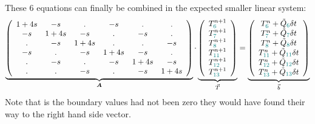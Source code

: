 These 6 equations can finally be combined in the expected smaller linear system:
\begin{equation}
\underbrace{
\left(
\begin{array}{cccccc}
1+4s & -s & . & -s & . & . \\
-s & 1+4s & -s & . & -s & . \\
. & -s & 1+4s & . & . & -s \\ 
-s & . & -s & 1+4s & -s & . \\
. & -s & . & -s & 1+4s & -s \\
. & . & -s & . & -s & 1+4s 
\end{array}
\right)
}_{\bm A}
\cdot
\underbrace{
\left(
\begin{array}{c}
T_{{\color{teal}6}}^{n+1} \\ 
T_{{\color{teal}7}}^{n+1} \\ 
T_{{\color{teal}8}}^{n+1} \\ 
T_{{\color{teal}11}}^{n+1} \\ 
T_{{\color{teal}12}}^{n+1} \\ 
T_{{\color{teal}13}}^{n+1} 
\end{array}
\right)
}_{\vec T}
=
\underbrace{
\left(
\begin{array}{c}
T_{{\color{teal}6}}^n + \tilde{Q}_{\color{teal}6}\delta t \\ 
T_{{\color{teal}7}}^n + \tilde{Q}_{\color{teal}7} \delta t\\ 
T_{{\color{teal}8}}^n + \tilde{Q}_{\color{teal}8} \delta t\\ 
T_{{\color{teal}11}}^n + \tilde{Q}_{\color{teal}11} \delta t\\ 
T_{{\color{teal}12}}^n + \tilde{Q}_{\color{teal}12} \delta t\\ 
T_{{\color{teal}13}}^n + \tilde{Q}_{\color{teal}13} \delta t
\end{array}
\right)
}_{\vec b}
\end{equation}
Note that is the boundary values had not been zero they would have found their way to the right hand side 
vector.







